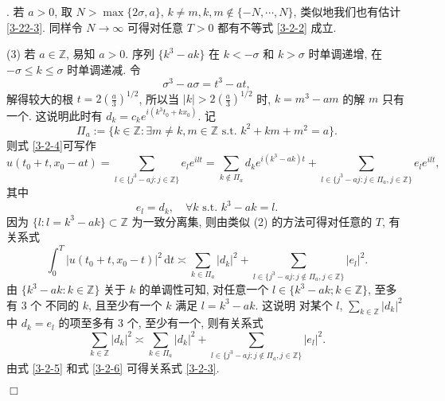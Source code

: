 \documentclass[master]{cugthesis}
\newcommand\Z{\ensuremath{\mathbb{Z}}}
\renewcommand\d{\ensuremath{\,\mathrm{d}}}
\newenvironment{proof}{{\noindent\itshape 证明}.}{\hfill $\Box$\par}
\begin{document}
\begin{proof}
    若 $a>0$, 取 $N>\max\lbrace 2\sigma, a\rbrace$, $k\neq m, k,m\notin \lbrace-N,\cdots, N\rbrace$, 类似地我们也有估计 \eqref{3-22-3}. 同样令 $N\to \infty$ 可得对任意 $T>0$ 都有不等式 \eqref{3-2-2} 成立. 
    
    (3) 若 $a\in \Z$, 易知 $a>0$. 序列 $\lbrace k^3-ak\rbrace$ 在 $k<-\sigma$ 和 $k>\sigma$ 时单调递增, 在 $-\sigma\le k\le \sigma$ 时单调递减. 令
    \begin{equation*}
        \sigma^3-a\sigma=t^3-at,
    \end{equation*}
    解得较大的根 $t=2\left(\frac{a}{3}\right)^{1 /2}$,
    所以当 $|k|> 2\left(\frac{a}{3}\right)^{1 /2}$ 时, $k=m^3-am$ 的解 $m$ 只有一个. 这说明此时有 $d_k=c_k e^{i(k^3t_0+kx_0)}$. 记
    \begin{equation}\label{pia}
        \Pi_a:=\lbrace k\in \Z : \exists m\neq k,m\in \Z \text{ s.t. } k^2+km+m^2=a \rbrace.
    \end{equation}
    则式 \eqref{3-2-4}可写作
    \begin{equation*}
        u(t_0+t,x_0-at)=\sum_{l\in \lbrace j^3-aj:j\in \Z  \rbrace}e_l e^{ilt}=\sum_{k\notin \Pi_a} d_k e^{i(k^3-ak)t}+\sum_{l\in \lbrace j^3-aj: j\in \Pi_a, j\in \Z\rbrace} e_l e^{ilt},
    \end{equation*}  
    其中
    \begin{equation*}
        e_l=d_k, \quad \forall k \text{ s.t. } k^3-ak=l.
    \end{equation*}
    因为 $\lbrace l: l=k^3-ak \rbrace \subset \Z $ 为一致分离集, 则由类似 (2) 的方法可得对任意的 $T$, 有关系式
    \begin{equation}\label{3-2-5}
        \int_0^T|u(t_0+t,x_0-t)|^2\d t\asymp \sum_{k\in \Pi_a}|d_k|^2+\sum_{l\in \lbrace j^3-aj: j \notin \Pi_a,j\in\Z\rbrace }|e_l|^2.
    \end{equation}
    由 $\lbrace k^3-ak:k\in \Z\rbrace$ 关于 $k$ 的单调性可知, 对任意一个 $l\in \lbrace k^3-ak; k\in \Z\rbrace$, 至多有 3 个 不同的 $k$, 且至少有一个 $k$  满足 $l=k^3-ak$. 这说明 对某个 $l$, $\sum_{k\in\Z} |d_k|^2$ 中 $d_k=e_l$ 的项至多有 3 个, 至少有一个, 则有关系式
    \begin{equation}\label{3-2-6}
        \sum_{k\in \Z}|d_k|^2\asymp  \sum_{k\in \Pi_a}|d_k|^2+\sum_{l\in \lbrace j^3-aj: j \notin \Pi_a,j\in\Z\rbrace }|e_l|^2.
    \end{equation}
    由式 \eqref{3-2-5} 和式 \eqref{3-2-6} 可得关系式 \eqref{3-2-3}.
    

\end{proof}
\end{document}
